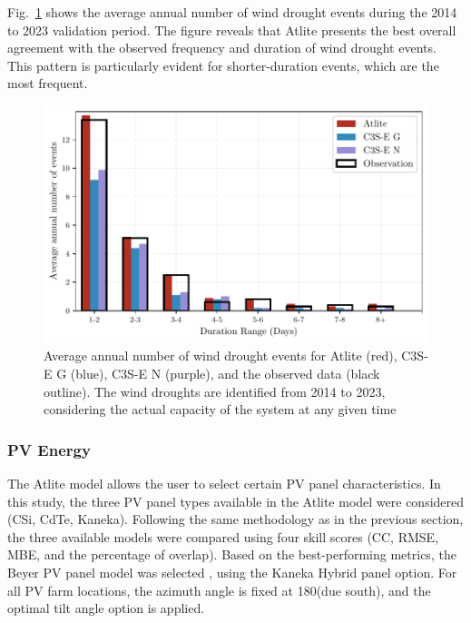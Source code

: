 \documentclass[preprint, 12pt]{elsarticle}
\begin{document}
Fig.~\ref{fig:bar_number_events_verification_wind} shows the average annual number of wind drought events during the 2014 to 2023 validation period. The figure reveals that Atlite presents the best overall agreement with the observed frequency and duration of wind drought events. This pattern is particularly evident for shorter-duration events, which are the most frequent.

\begin{figure}[!ht]
	\centering
	\includegraphics[width=\textwidth]{verification_wind_number_events.pdf}
	\caption{Average annual number of wind drought events for Atlite (red), C3S-E G (blue), C3S-E N (purple), and the observed data (black outline). The wind droughts are identified from 2014 to 2023, considering the actual capacity of the system at any given time}
	\label{fig:bar_number_events_verification_wind}
\end{figure}

\subsubsection{PV Energy}
\label{sec:pv_verification}

The Atlite model allows the user to select certain PV panel characteristics. In this study, the three PV panel types available in the Atlite model were considered (CSi, CdTe, Kaneka). Following the same methodology as in the previous section, the three available models were compared using four skill scores (CC, RMSE, MBE, and the percentage of overlap). Based on the best-performing metrics, the Beyer PV panel model was selected \citep{beyer2004pv}, using the Kaneka Hybrid panel option. For all PV farm locations, the azimuth angle is fixed at 180\textdegree (due south), and the optimal tilt angle option is applied. 
\end{document}
